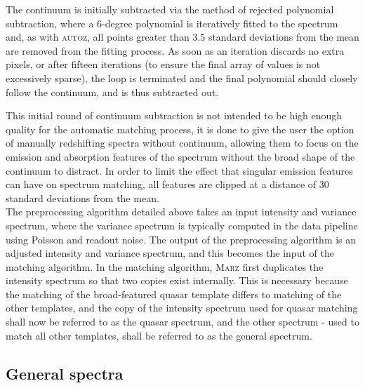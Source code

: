 \documentclass[5p]{elsarticle}
\newcommand{\autoz}{\textsc{autoz}}
\newcommand{\marz}{\textsc{Marz}}
\begin{document}
The continuum is initially subtracted via the method of rejected polynomial subtraction, where a 6-degree polynomial is iteratively fitted to the spectrum and, as with \autoz{}, all points greater than 3.5 standard deviations from the mean are removed from the fitting process. As soon as an iteration discards no extra pixels, or after fifteen iterations (to ensure the final array of values is not excessively sparse), the loop is terminated and the final polynomial should closely follow the continuum, and is thus subtracted out.

This initial round of continuum subtraction is not intended to be high enough quality for the automatic matching process, it is done to give the user the option of manually redshifting spectra without continuum, allowing them to focus on the emission and absorption features of the spectrum without the broad shape of the continuum to distract. In order to limit the effect that singular emission features can have on spectrum matching, all features are clipped at a distance of 30 standard deviations from the mean.\\







The preprocessing algorithm detailed above takes an input intensity and variance spectrum, where the variance spectrum is typically computed in the data pipeline using Poisson and readout noise. The output of the preprocessing algorithm is an adjusted intensity and variance spectrum, and this becomes the input of the matching algorithm. In the matching algorithm, \marz{} first duplicates the intensity spectrum so that two copies exist internally. This is necessary because the matching of the broad-featured quasar template differs to matching of the other templates, and the copy of the intensity spectrum used for quasar matching shall now be referred to as the quasar spectrum, and the other spectrum - used to match all other templates, shall be referred to as the general spectrum.

\subsection{General spectra}
\end{document}
